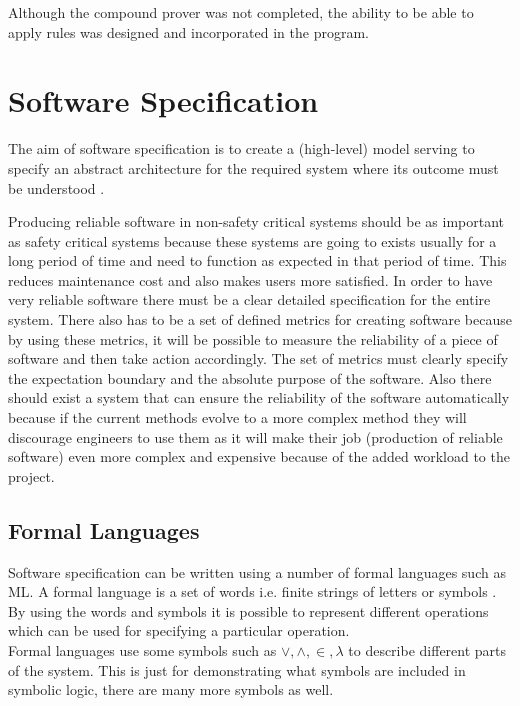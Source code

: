 \documentclass[10pt, a4paper, titlepage]{article}
\begin{document}
Although the compound prover was not completed, the ability to be able to apply rules was designed and incorporated in the program.

\section{Software Specification}
\label{sec:specification}

The aim of software specification is to create a (high-level) model serving to specify an abstract architecture for the required system where its outcome must be understood \cite{Howse_2005}. 

Producing reliable software in non-safety critical systems should be as important as safety critical systems because these systems are going to exists usually for a long period of time and need to function as expected in that period of time. This reduces maintenance cost and also makes users more satisfied. In order to have very reliable software there must be a clear detailed specification for the entire system. There also has to be a set of defined metrics for creating software because by using these metrics, it will be possible to measure the reliability of a piece of software and then take action accordingly. The set of metrics must clearly specify the expectation boundary and the absolute purpose of the software. Also there should exist a system that can ensure the reliability of the software automatically because if the current methods evolve to a more complex method they will discourage engineers to use them as it will make their job (production of reliable software) even more complex and expensive because of the added workload to the project. 


\subsection{Formal Languages}

Software specification can be written using a number of formal languages such as ML. A formal language is a set of words i.e. finite strings of letters or symbols \cite{Mateescu_1997}. By using the words and symbols it is possible to represent different operations which can be used for specifying a particular operation.\\

Formal languages use some symbols such as $\vee, \wedge, \in, \lambda$ to describe different parts of the system. This is just for demonstrating what symbols are included in symbolic logic, there are many more symbols as well.
\end{document}
